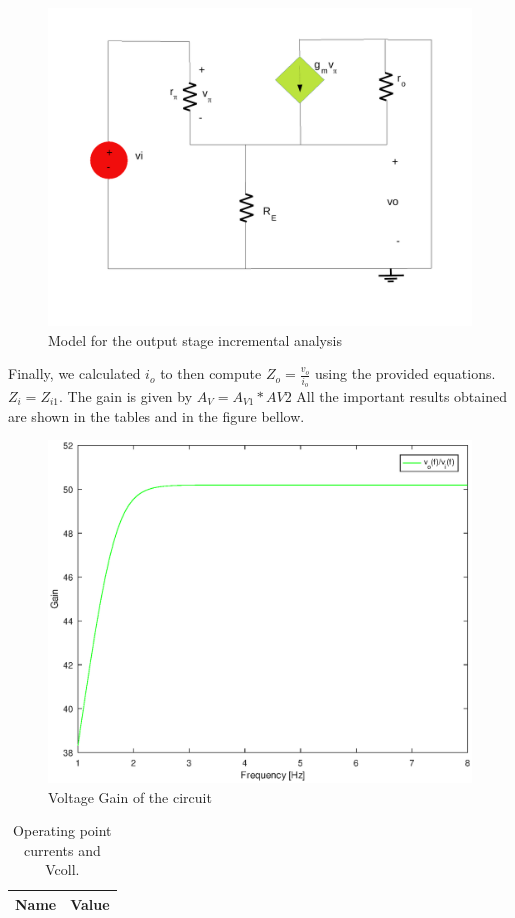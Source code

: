 \begin{figure}[h] \centering
\includegraphics[width=0.65\linewidth]{lab41.pdf}
\caption{Model for the output stage incremental analysis}
\label{s}
\end{figure}



Finally, we calculated $i_o$ to then compute $Z_o=\frac{v_{o}}{i_o}$ using the provided equations. $Z_i=Z_{i1}$. The gain is given by $A_V = A_{V1}*{AV2}$
All the important results obtained are shown in the tables and in the figure bellow. 


\begin{figure}[h] \centering
\includegraphics[width=0.65\linewidth]{theo.eps}
\caption{Voltage Gain of the circuit}
\label{sh}
\end{figure}


\begin{table}[ht]
  \centering
  \begin{tabular}{|l|r|}
    \hline    
    {\bf Name} & {\bf Value} \\ \hline
    
  \end{tabular}
  \caption{Operating point currents and Vcoll.}
  \label{tab:1}
\end{table}


